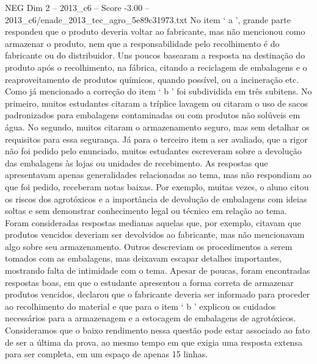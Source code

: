 \begin{textsample}{NEG Dim 2 – 2013\_c6 – Score -3.00 – 2013\_c6/enade\_2013\_tec\_agro\_5e89c31973.txt}
No item ‘ a ’, grande parte respondeu que o produto deveria voltar ao fabricante, mas não mencionou como armazenar o produto, nem que a responsabilidade pelo recolhimento é do fabricante ou do distribuidor.
Uns poucos basearam a resposta na destinação do produto após o recolhimento, na fábrica, citando a reciclagem de embalagens e o reaproveitamento de produtos químicos, quando possível, ou a incineração etc.
Como já mencionado a correção do item ‘ b ’ foi subdividida em três subitens.
No primeiro, muitos estudantes citaram a tríplice lavagem ou citaram o uso de sacos padronizados para embalagens contaminadas ou com produtos não solúveis em água.
No segundo, muitos citaram o armazenamento seguro, mas sem detalhar os requisitos para essa segurança.
Já para o terceiro item a ser avaliado, que a rigor não foi pedido pelo enunciado, muitos estudantes escreveram sobre a devolução das embalagens às lojas ou unidades de recebimento.
As respostas que apresentavam apenas generalidades relacionadas ao tema, mas não respondiam ao que foi pedido, receberam notas baixas.
Por exemplo, muitas vezes, o aluno citou os riscos dos agrotóxicos e a importância de devolução de embalagens com ideias soltas e sem demonstrar conhecimento legal ou técnico em relação ao tema.
Foram consideradas respostas medianas aquelas que, por exemplo, citavam que produtos vencidos deveriam ser devolvidos ao fabricante, mas não mencionavam algo sobre seu armazenamento.
Outros descreviam os procedimentos a serem tomados com as embalagens, mas deixavam escapar detalhes importantes, mostrando falta de intimidade com o tema.
Apesar de poucas, foram encontradas respostas boas, em que o estudante apresentou a forma correta de armazenar produtos vencidos, declarou que o fabricante deveria ser informado para proceder ao recolhimento do material e que para o item ‘ b ’ explicou os cuidados necessários para a armazenagem e a estocagem de embalagens de agrotóxicos.
Consideramos que o baixo rendimento nessa questão pode estar associado ao fato de ser a última da prova, ao mesmo tempo em que exigia uma resposta extensa para ser completa, em um espaço de apenas 15 linhas.

\end{textsample}
